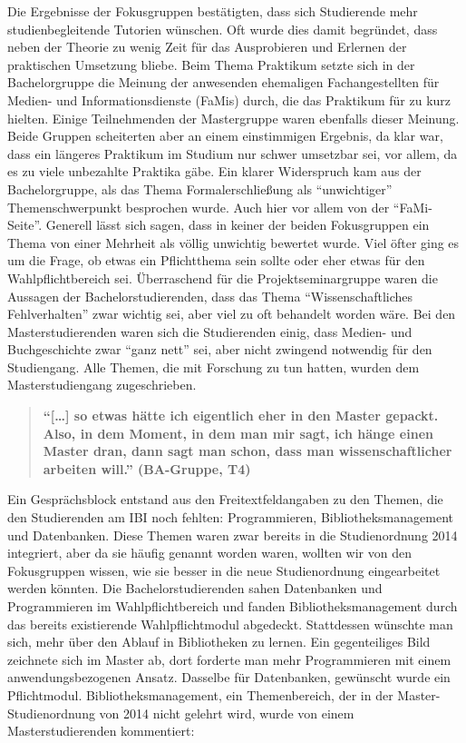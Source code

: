 \documentclass[a4paper,
fontsize=11pt,
oneside,
numbers=noperiodatend,
parskip=half-,
bibliography=totoc,
final
]{scrartcl}
\begin{document}
Die Ergebnisse der Fokusgruppen bestätigten, dass sich Studierende mehr
studienbegleitende Tutorien wünschen. Oft wurde dies damit begründet,
dass neben der Theorie zu wenig Zeit für das Ausprobieren und Erlernen
der praktischen Umsetzung bliebe. Beim Thema Praktikum setzte sich in
der Bachelorgruppe die Meinung der anwesenden ehemaligen
Fachangestellten für Medien- und Informationsdienste (FaMis) durch, die
das Praktikum für zu kurz hielten. Einige Teilnehmenden der Mastergruppe
waren ebenfalls dieser Meinung. Beide Gruppen scheiterten aber an einem
einstimmigen Ergebnis, da klar war, dass ein längeres Praktikum im
Studium nur schwer umsetzbar sei, vor allem, da es zu viele unbezahlte
Praktika gäbe. Ein klarer Widerspruch kam aus der Bachelorgruppe, als
das Thema Formalerschließung als \enquote{unwichtiger} Themenschwerpunkt
besprochen wurde. Auch hier vor allem von der \enquote{FaMi-Seite}.
Generell lässt sich sagen, dass in keiner der beiden Fokusgruppen ein
Thema von einer Mehrheit als völlig unwichtig bewertet wurde. Viel öfter
ging es um die Frage, ob etwas ein Pflichtthema sein sollte oder eher
etwas für den Wahlpflichtbereich sei. Überraschend für die
Projektseminargruppe waren die Aussagen der Bachelorstudierenden, dass
das Thema \enquote{Wissenschaftliches Fehlverhalten} zwar wichtig sei,
aber viel zu oft behandelt worden wäre. Bei den Masterstudierenden waren
sich die Studierenden einig, dass Medien- und Buchgeschichte zwar
\enquote{ganz nett} sei, aber nicht zwingend notwendig für den
Studiengang. Alle Themen, die mit Forschung zu tun hatten, wurden dem
Masterstudiengang zugeschrieben.

\begin{quote}
\textbf{\enquote{{[}\ldots{}{]} so etwas hätte ich eigentlich eher in
den Master gepackt. Also, in dem Moment, in dem man mir sagt, ich hänge
einen Master dran, dann sagt man schon, dass man wissenschaftlicher
arbeiten will.} (BA-Gruppe, T4)}
\end{quote}

Ein Gesprächsblock entstand aus den Freitextfeldangaben zu den Themen,
die den Studierenden am IBI noch fehlten: Programmieren,
Bibliotheksmanagement und Datenbanken. Diese Themen waren zwar bereits
in die Studienordnung 2014 integriert, aber da sie häufig genannt worden
waren, wollten wir von den Fokusgruppen wissen, wie sie besser in die
neue Studienordnung eingearbeitet werden könnten. Die
Bachelorstudierenden sahen Datenbanken und Programmieren im
Wahlpflichtbereich und fanden Bibliotheksmanagement durch das bereits
existierende Wahlpflichtmodul abgedeckt. Stattdessen wünschte man sich,
mehr über den Ablauf in Bibliotheken zu lernen. Ein gegenteiliges Bild
zeichnete sich im Master ab, dort forderte man mehr Programmieren mit
einem anwendungsbezogenen Ansatz. Dasselbe für Datenbanken, gewünscht
wurde ein Pflichtmodul. Bibliotheksmanagement, ein Themenbereich, der in
der Master-Studienordnung von 2014 nicht gelehrt wird, wurde von einem
Masterstudierenden kommentiert:
\end{document}
